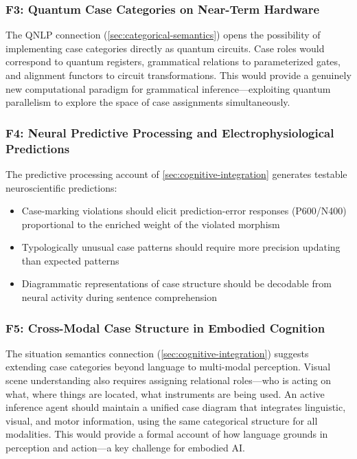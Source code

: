 \documentclass[
]{article}
\providecommand{\tightlist}{%
  \setlength{\itemsep}{0pt}\setlength{\parskip}{0pt}}
\numberwithin{equation}{section}
\begin{document}
\subsubsection{F3: Quantum Case Categories on Near-Term
Hardware}\label{f3-quantum-case-categories-on-near-term-hardware}

The QNLP connection (\autoref{sec:categorical-semantics}) opens the
possibility of implementing case categories directly as quantum
circuits. Case roles would correspond to quantum registers, grammatical
relations to parameterized gates, and alignment functors to circuit
transformations. This would provide a genuinely new computational
paradigm for grammatical inference---exploiting quantum parallelism to
explore the space of case assignments simultaneously.

\subsubsection{F4: Neural Predictive Processing and Electrophysiological
Predictions}\label{f4-neural-predictive-processing-and-electrophysiological-predictions}

The predictive processing account of \autoref{sec:cognitive-integration}
generates testable neuroscientific predictions:

\begin{itemize}
\tightlist
\item
  Case-marking violations should elicit prediction-error responses
  (P600/N400) proportional to the enriched weight of the violated
  morphism
\item
  Typologically unusual case patterns should require more precision
  updating than expected patterns
\item
  Diagrammatic representations of case structure should be decodable
  from neural activity during sentence comprehension
\end{itemize}

\subsubsection{F5: Cross-Modal Case Structure in Embodied
Cognition}\label{f5-cross-modal-case-structure-in-embodied-cognition}

The situation semantics connection (\autoref{sec:cognitive-integration})
suggests extending case categories beyond language to multi-modal
perception. Visual scene understanding also requires assigning
relational roles---who is acting on what, where things are located, what
instruments are being used. An active inference agent should maintain a
unified case diagram that integrates linguistic, visual, and motor
information, using the same categorical structure for all modalities.
This would provide a formal account of how language grounds in
perception and action---a key challenge for embodied AI.
\end{document}
